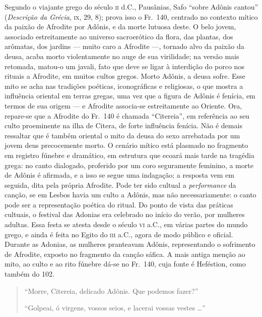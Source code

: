 {\small Segundo o viajante grego do século \textsc{ii} d.C., Pausânias, Safo “sobre
Adônis cantou” (\textit{Descrição da Grécia}, \textsc{ix}, 29, 8); prova isso o Fr.~140, 
centrado no contexto mítico da paixão de Afrodite por Adônis, e da morte
lutuosa deste. O belo jovem, associado estreitamente ao universo sacroerótico da
flora, das plantas, dos arômatas, dos jardins --- muito caro a Afrodite ---,
tornado alvo da paixão da deusa, acaba morto violentamente no auge de sua
virilidade; na versão mais retomada, matou-o um javali, fato que deve se ligar
à interdição do porco nos rituais a Afrodite, em muitos cultos gregos. Morto
Adônis, a deusa sofre. Esse mito se acha nas tradições poéticas, iconográficas
e religiosas, o que mostra a influência oriental em terras gregas, uma vez que
a figura de Adônis é fenícia, em termos de sua origem --- e Afrodite associa-se
estreitamente ao Oriente. Ora, repare-se que a Afrodite do Fr.~140 é chamada
``Citereia”, em referência ao seu culto proeminente na ilha de Citera,
de forte influência fenícia. Não é demais ressaltar que é também oriental o
mito da deusa do sexo arrebatada por um jovem deus precocemente morto. O
cenário mítico está plasmado no fragmento em registro fúnebre e dramático, em
estrutura que ecoará mais tarde na tragédia grega: no canto dialogado,
proferido por um coro seguramente feminino, a morte de Adônis é afirmada, e a isso
se segue uma indagação; a resposta vem em seguida, dita pela própria Afrodite.
Pode ter sido cultual a \textit{performance} da canção, se em Lesbos havia um
culto a Adônis, mas não necessariamente: o canto pode ser a representação
poética do ritual. Do ponto de vista das práticas cultuais, o festival das Adonias 
era celebrado no início do verão, por mulheres adultas. Essa festa se atesta 
desde o século \textsc{vi} a.C., em várias partes do
mundo grego, e ainda é feita no Egito do \textsc{iii} a.C., agora de modo público e
oficial. Durante as Adonias, as mulheres pranteavam Adônis, representando o
sofrimento de Afrodite, exposto no fragmento da canção sáfica. A mais antiga
menção ao mito, ao culto e ao rito fúnebre dá-se no Fr.~140, cuja fonte é
Heféstion, como também do 102.}

\begin{verse}
“Morre, Citereia, delicado Adônis. Que \qb{}podemos fazer?”

“Golpeai, ó virgens, vossos seios, e lacerai \qb{}vossas vestes \ldots{}”
\end{verse}

\oneside

